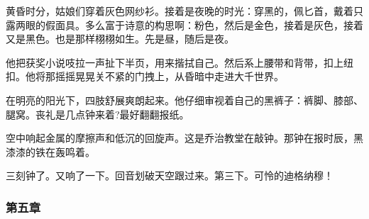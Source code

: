 \par 黄昏时分，姑娘们穿着灰色网纱衫。接着是夜晚的时光：穿黑的，佩匕首，戴着只露两眼的假面具。多么富于诗意的构思啊：粉色，然后是金色，接着是灰色，接着又是黑色。也是那样栩栩如生。先是昼，随后是夜。
\par 他把获奖小说吱拉一声扯下半页，用来揩拭自己。然后系上腰带和背带，扣上纽扣。他将那摇摇晃晃关不紧的门拽上，从昏暗中走进大千世界。
\par 在明亮的阳光下，四肢舒展爽朗起来。他仔细审视着自己的黑裤子：裤脚、膝部、腿窝。丧礼是几点钟来着?最好翻翻报纸。
\par 空中响起金属的摩擦声和低沉的回旋声。这是乔治教堂在敲钟。那钟在报时辰，黑漆漆的铁在轰鸣着。
\par 三刻钟了。又响了一下。回音划破天空跟过来。第三下。可怜的迪格纳穆！





\subsubsection*{第五章}


